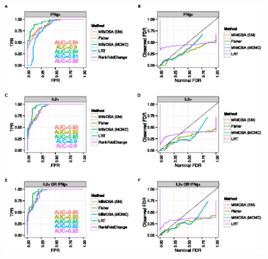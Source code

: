 \documentclass[12pt,oupdraft]{biostatistics}
\begin{document}
\begin{figure} %
   \centering
   \includegraphics{TIKZFig1.eps}

\end{figure}
\end{document}
